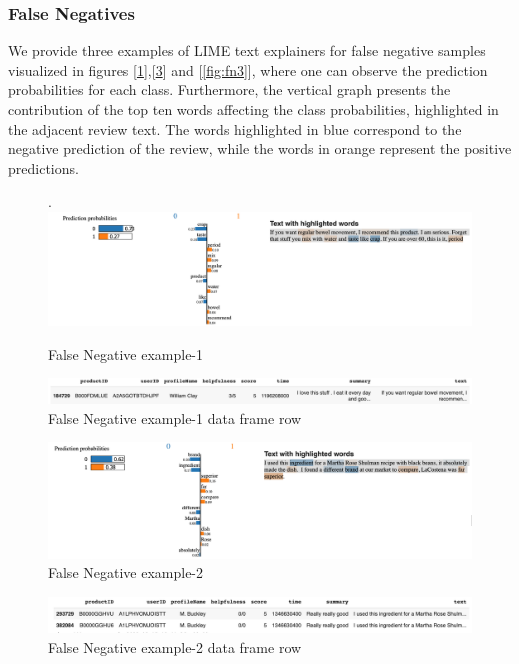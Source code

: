 \documentclass[11pt]{article}
\begin{document}
\subsubsection{False Negatives}
We provide three examples of LIME text explainers for false negative samples visualized in figures [\ref{fig:fn1}],[\ref{fig:fn2}] and [\ref{fig:fn3}], where one can observe the prediction probabilities for each class. Furthermore, the vertical graph presents the contribution of the top ten words affecting the class probabilities, highlighted in the adjacent review text. The words highlighted in blue correspond to the negative prediction of the review, while the words in orange represent the positive predictions.

\begin{figure}.
    \centering
    \includegraphics[scale=0.4]{figures/fn1.png}
    \caption{False Negative example-1}
    \label{fig:fn1}
\end{figure}
\begin{figure}
    \centering
    \includegraphics[scale=0.4]{figures/fn1_row.png}
    \caption{False Negative example-1 data frame row}
    \label{fig:fn1_row}
\end{figure}

\begin{figure}
    \centering
    \includegraphics[scale=0.4]{figures/fn2.png}
    \caption{False Negative example-2}
    \label{fig:fn2}
\end{figure}
\begin{figure}
    \centering
    \includegraphics[scale=0.4]{figures/fn2_row.png}
    \caption{False Negative example-2 data frame row}
    \label{fig:fn2_row}
\end{figure}
\end{document}
